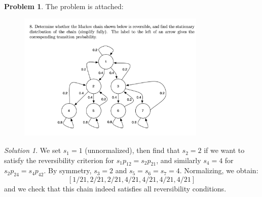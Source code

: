 \documentclass[11pt]{article}
\theoremstyle{definition}
\newtheorem{prob}[theo]{\color{Maroon} Problem}
\theoremstyle{remark}
\newtheorem*{soln}{\color{Maroon} Solution}
\begin{document}
\begin{prob}

The problem is attached:

\begin{figure}[h!]
    \centering
    \includegraphics[width=0.8\textwidth]{image/2015p8.png}
\end{figure}

\begin{soln}
We set $s_1 = 1$ (unnormalized), then find that $s_2 = 2$ if we want to satisfy the reversibility criterion for $s_1p_{12} = s_2p_{21}$, and similarly $s_4 = 4$ for $s_2p_{24} = s_4p_{42}$. By symmetry, $s_3 = 2$ and $s_5 = s_6 = s_7 = 4$. Normalizing, we obtain:
\[
[1/21, 2/21, 2/21, 4/21, 4/21, 4/21, 4/21]
\]
and we check that this chain indeed satisfies all reversibility conditions.
\end{soln}

\end{prob}
\end{document}
